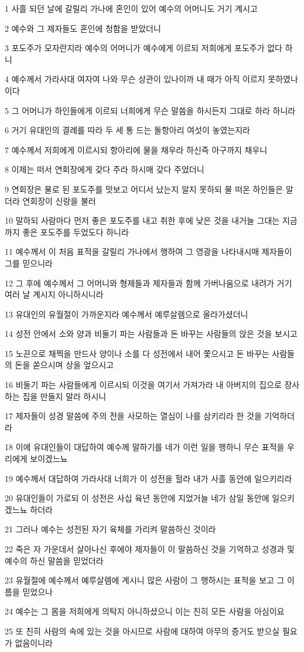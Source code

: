 \par 1 사흘 되던 날에 갈릴리 가나에 혼인이 있어 예수의 어머니도 거기 계시고
\par 2 예수와 그 제자들도 혼인에 청함을 받았더니
\par 3 포도주가 모자란지라 예수의 어머니가 예수에게 이르되 저희에게 포도주가 없다 하니
\par 4 예수께서 가라사대 여자여 나와 무슨 상관이 있나이까 내 때가 아직 이르지 못하였나이다
\par 5 그 어머니가 하인들에게 이르되 너희에게 무슨 말씀을 하시든지 그대로 하라 하니라
\par 6 거기 유대인의 결례를 따라 두 세 통 드는 돌항아리 여섯이 놓였는지라
\par 7 예수께서 저희에게 이르시되 항아리에 물을 채우라 하신즉 아구까지 채우니
\par 8 이제는 떠서 연회장에게 갖다 주라 하시매 갖다 주었더니
\par 9 연회장은 물로 된 포도주를 맛보고 어디서 났는지 알지 못하되 물 떠온 하인들은 알더라 연회장이 신랑을 불러
\par 10 말하되 사람마다 먼저 좋은 포도주를 내고 취한 후에 낮은 것을 내거늘 그대는 지금까지 좋은 포도주를 두었도다 하니라
\par 11 예수께서 이 처음 표적을 갈릴리 가나에서 행하여 그 영광을 나타내시매 제자들이 그를 믿으니라
\par 12 그 후에 예수께서 그 어머니와 형제들과 제자들과 함께 가버나움으로 내려가 거기 여러 날 계시지 아니하시니라
\par 13 유대인의 유월절이 가까운지라 예수께서 예루살렘으로 올라가셨더니
\par 14 성전 안에서 소와 양과 비둘기 파는 사람들과 돈 바꾸는 사람들의 앉은 것을 보시고
\par 15 노끈으로 채찍을 만드사 양이나 소를 다 성전에서 내어 쫓으시고 돈 바꾸는 사람들의 돈을 쏟으시며 상을 엎으시고
\par 16 비둘기 파는 사람들에게 이르시되 이것을 여기서 가져가라 내 아버지의 집으로 장사하는 집을 만들지 말라 하시니
\par 17 제자들이 성경 말씀에 주의 전을 사모하는 열심이 나를 삼키리라 한 것을 기억하더라
\par 18 이에 유대인들이 대답하여 예수께 말하기를 네가 이런 일을 행하니 무슨 표적을 우리에게 보이겠느뇨
\par 19 예수께서 대답하여 가라사대 너희가 이 성전을 헐라 내가 사흘 동안에 일으키리라
\par 20 유대인들이 가로되 이 성전은 사십 육년 동안에 지었거늘 네가 삼일 동안에 일으키겠느뇨 하더라
\par 21 그러나 예수는 성전된 자기 육체를 가리켜 말씀하신 것이라
\par 22 죽은 자 가운데서 살아나신 후에야 제자들이 이 말씀하신 것을 기억하고 성경과 및 예수의 하신 말씀을 믿었더라
\par 23 유월절에 예수께서 예루살렘에 계시니 많은 사람이 그 행하시는 표적을 보고 그 이름을 믿었으나
\par 24 예수는 그 몸을 저희에게 의탁지 아니하셨으니 이는 친히 모든 사람을 아심이요
\par 25 또 친히 사람의 속에 있는 것을 아시므로 사람에 대하여 아무의 증거도 받으실 필요가 없음이니라


